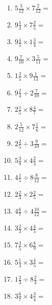 \documentclass[12pt]{article}
\begin{document}
\begin{enumerate}
\item \large $ 5 \frac{3}{12} \times 7 \frac{2}{12} = $ \vspace{1.6cm}
\item \large $ 9 \frac{1}{3} \times 7 \frac{2}{5} = $ \vspace{1.6cm}
\item \large $ 9 \frac{4}{5} \times 1 \frac{3}{4} = $ \vspace{1.6cm}
\item \large $ 9 \frac{7}{10} \times 3 \frac{5}{11} = $ \vspace{1.6cm}
\newpage
\item \large $ 1 \frac{3}{5} \times 9 \frac{1}{12} = $ \vspace{1.6cm}
\item \large $ 9 \frac{2}{4} \div 2 \frac{7}{10} = $ \vspace{1.6cm}
\item \large $ 2 \frac{1}{5} \times 8 \frac{4}{7} = $ \vspace{1.6cm}
\item \large $ 2 \frac{5}{12} \times 7 \frac{1}{6} = $ \vspace{1.6cm}
\item \large $ 2 \frac{2}{5} \div 3 \frac{9}{10} = $ \vspace{1.6cm}
\item \large $ 5 \frac{3}{9} \times 4 \frac{2}{3} = $ \vspace{1.6cm}
\item \large $ 4 \frac{1}{5} \div 8 \frac{8}{12} = $ \vspace{1.6cm}
\item \large $ 2 \frac{2}{3} \times 2 \frac{2}{5} = $ \vspace{1.6cm}
\item \large $ 4 \frac{6}{7} \div 4 \frac{10}{12} = $ \vspace{1.6cm}
\item \large $ 3 \frac{2}{3} \times 4 \frac{4}{5} = $ \vspace{1.6cm}
\newpage
\item \large $ 7 \frac{3}{5} \times 6 \frac{8}{9} = $ \vspace{1.6cm}
\item \large $ 5 \frac{1}{3} \times 3 \frac{4}{5} = $ \vspace{1.6cm}
\item \large $ 1 \frac{2}{3} \div 8 \frac{2}{4} = $ \vspace{1.6cm}
\item \large $ 3 \frac{6}{7} \times 4 \frac{3}{4} = $ \vspace{1.6cm}

\end{enumerate}
\end{document}
